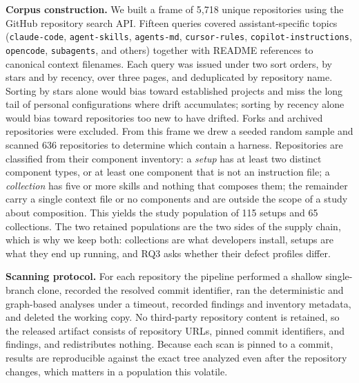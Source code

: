 \documentclass[conference]{IEEEtran}
\begin{document}
\textbf{Corpus construction.} We built a frame of 5{,}718 unique repositories
using the GitHub repository search API. Fifteen queries covered
assistant-specific topics (\texttt{claude-code}, \texttt{agent-skills},
\texttt{agents-md}, \texttt{cursor-rules}, \texttt{copilot-instructions},
\texttt{opencode}, \texttt{subagents}, and others) together with README
references to canonical context filenames. Each query was issued under two sort
orders, by stars and by recency, over three pages, and deduplicated by
repository name. Sorting by stars alone would bias toward established projects
and miss the long tail of personal configurations where drift accumulates;
sorting by recency alone would bias toward repositories too new to have drifted.
Forks and archived repositories were excluded. From this frame we drew a seeded
random sample and scanned 636 repositories to determine which contain a harness.
Repositories are classified from their component inventory: a \emph{setup} has
at least two distinct component types, or at least one component that is not an
instruction file; a \emph{collection} has five or more skills and nothing that
composes them; the remainder carry a single context file or no components and
are outside the scope of a study about composition. This yields the study
population of 115 setups and 65 collections. The two retained populations are
the two sides of the supply chain, which is why we keep both: collections are
what developers install, setups are what they end up running, and RQ3 asks
whether their defect profiles differ.

\textbf{Scanning protocol.} For each repository the pipeline performed a shallow
single-branch clone, recorded the resolved commit identifier, ran the
deterministic and graph-based analyses under a timeout, recorded findings and
inventory metadata, and deleted the working copy. No third-party repository
content is retained, so the released artifact consists of repository URLs, pinned
commit identifiers, and findings, and redistributes nothing. Because each scan is
pinned to a commit, results are reproducible against the exact tree analyzed even
after the repository changes, which matters in a population this volatile.
\end{document}

